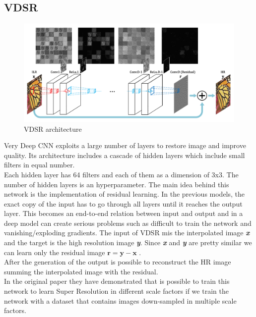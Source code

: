 \documentclass[10pt,twocolumn,letterpaper]{article}
\begin{document}
\subsection{VDSR}
\begin{figure}[]
	\centering
	\includegraphics[width=\textwidth]{img/vdsr.png}
	\caption{VDSR architecture\cite{kim2015accurate}}
	\label{vdsr}
\end{figure}
Very Deep CNN exploits a large number of layers to restore image and improve quality.
Its architecture includes a cascade of hidden layers which include small filters in equal number.\\
Each hidden layer has 64 filters and each of them as a dimension of 3x3.
The number of hidden layers is an hyperparameter.
The main idea behind this network is the implementation of residual learning. In the previous models, the exact copy of the input has to go through all layers until it reaches the output layer. This becomes an end-to-end relation between input  and output and in a deep model can create serious problems such as difficult to train the network and vanishing/exploding gradients.
The input of VDSR mis the interpolated image \textit{\textbf{x}} and the target is the high resolution image \textit{\textbf{y}}.
Since \textit{\textbf{x}} and \textit{\textbf{y}} are pretty similar we can learn only the residual image $\textbf{r} = \textbf{y} - \textbf{x}$ .\\
After the generation of the output is possible to reconstruct the HR image summing the interpolated image with the residual.\\
In the original paper they have demonstrated that is possible to train this network to learn Super Resolution in  different scale factors if we train the network with a dataset that contains images down-sampled in multiple scale factors.
\end{document}
